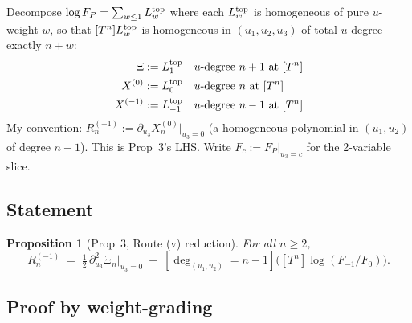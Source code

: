 \documentclass[11pt]{amsart}
\newtheorem{proposition}{Proposition}
\newcommand{\FP}{F_P}
\newcommand{\Rminus}{R^{(-1)}}
\newcommand{\Xtop}{X^{(0)}}
\newcommand{\Xminus}{X^{(-1)}}
\newcommand{\uu}{(u_1, u_2, u_3)}
\newcommand{\deghom}[1]{[\deg_{(u_1,u_2)} = #1]}
\begin{document}
Decompose $\log \FP = \sum_{w \le 1} L^{\rm top}_w$ where each $L^{\rm top}_w$
is homogeneous of pure $u$-weight $w$, so that $[T^n] L^{\rm top}_w$ is
homogeneous in $\uu$ of total $u$-degree exactly $n + w$:
\begin{align*}
\Xi &:= L^{\rm top}_1 && u\text{-degree } n+1 \text{ at } [T^n] \\
\Xtop &:= L^{\rm top}_0 && u\text{-degree } n \text{ at } [T^n] \\
\Xminus &:= L^{\rm top}_{-1} && u\text{-degree } n-1 \text{ at } [T^n]
\end{align*}
My convention: $\Rminus_n := \partial_{u_3} \Xtop_n|_{u_3=0}$
(a homogeneous polynomial in $(u_1, u_2)$ of degree $n-1$). This is Prop~3's
LHS. Write $F_c := \FP|_{u_3 = c}$ for the 2-variable slice.

\subsection{Statement}

\begin{proposition}[Prop~3, Route (v) reduction]
\label{prop:prop3}
For all $n \ge 2$,
\[
\boxed{\;\;\Rminus_n \;=\; \tfrac{1}{2}\, \partial_{u_3}^2 \Xi_n\big|_{u_3 = 0}
\;-\; \deghom{n-1}\!\bigl([T^n] \log(F_{-1}/F_0)\bigr).\;\;}
\]
\end{proposition}

\subsection{Proof by weight-grading}
\end{document}
